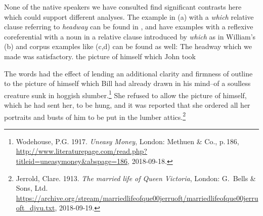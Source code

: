 \documentclass[output=paper]{langsci/langscibook}
\begin{document}
\label{ex:min-headway-which}
\zl
\eal
{}
\label{ex:min-admire-that}
\label{ex:min-admire-which} 
\zl
\eal
{}
\label{ex:min-picture-that}
\label{ex:min-picture-which} 
\zl
None of the native speakers we have consulted find significant contrasts here which could support
different analyses. The example in (a) with a \emph{which} relative clause referring to \emph{headway} can be found in
,  and  have examples
with a reflexive coreferential with a noun in a relative clause introduced by \emph{which} as in
William's (b) and corpus examples like (c,d) can be found as well:
\ealnoraggedright
\ex The headway which we made was satisfactory.
\ex the picture of himself which John took

\ex The words had the effect of lending an additional clarity and firmness of outline to the picture
    of himself which Bill had already drawn in his mind--of a soulless creature sunk in hoggish
    slumber.\footnote{
      Wodehouse, P.G. 1917. \emph{Uneasy Money}, London: Methuen \& Co., p.\,186,
      \url{http://www.literaturepage.com/read.php?titleid=uneasymoney&abspage=186},
      2018-09-18.
}
\ex She refused to allow the 
picture of himself, which he had sent her, to be hung, 
and it was reported that she ordered all her portraits 
and busts of him to be put in the lumber attics.\footnote{
 Jerrold, Clare. 1913. \emph{The married life of Queen Victoria}, London: G.\ Bells \& Sons, Ltd.
 \url{https://archive.org/stream/marriedlifeofque00jerruoft/marriedlifeofque00jerruoft_djvu.txt}, 2018-09-19.
}
\end{document}
